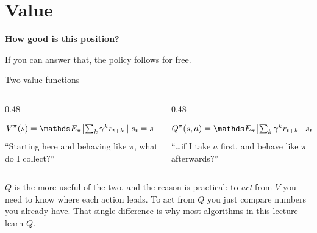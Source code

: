 \documentclass[aspectratio=169]{beamer}
\begin{document}
\section{Value}
\begin{frame}[plain]
  \begin{center}
    \vskip 1.6cm
    {\Huge\bfseries\color{popblue}How good is this position?}

    \vskip 0.6cm
    {\large If you can answer that, the policy follows for free.}
  \end{center}
\end{frame}

\begin{frame}{Two value functions}
  \begin{columns}[T]
    \begin{column}{0.48\textwidth}
      \begin{tcolorbox}[colback=armblue!8, colframe=armblue, boxrule=0.6pt, arc=2pt,
                        title=\textbf{State value} $V^\pi(s)$]
        \small
        \[ V^\pi(s) = \E_\pi\!\left[\textstyle\sum_k \gamma^k r_{t+k} \mid s_t = s\right] \]
        \vskip 2pt
        ``Starting here and behaving like $\pi$, what do I collect?''
      \end{tcolorbox}
    \end{column}
    \begin{column}{0.48\textwidth}
      \begin{tcolorbox}[colback=paramgreen!8, colframe=paramgreen, boxrule=0.6pt, arc=2pt,
                        title={\textbf{Action value} $Q^\pi(s,a)$}]
        \small
        \[ Q^\pi(s,a) = \E_\pi\!\left[\textstyle\sum_k \gamma^k r_{t+k} \mid s_t = s, a_t = a\right] \]
        \vskip 2pt
        ``\dots if I take $a$ first, and behave like $\pi$ afterwards?''
      \end{tcolorbox}
    \end{column}
  \end{columns}

  \vskip 10pt
  \begin{tcolorbox}[colback=lightbg, colframe=popblue, boxrule=0.6pt, arc=2pt]
    \small
    $Q$ is the more useful of the two, and the reason is practical: to \emph{act} from $V$ you
    need to know where each action leads. To act from $Q$ you just compare numbers you already
    have. That single difference is why most algorithms in this lecture learn $Q$.
  \end{tcolorbox}
\end{frame}
\end{document}
